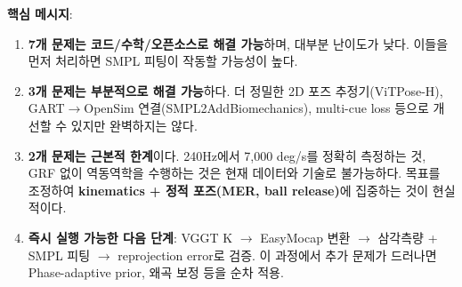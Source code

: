 \documentclass[11pt, a4paper]{report}
\begin{document}
\begin{summary}
\textbf{핵심 메시지}:
\begin{enumerate}[leftmargin=*]
  \item \textbf{7개 문제는 코드/수학/오픈소스로 해결 가능}하며, 대부분 난이도가 낮다. 이들을 먼저 처리하면 SMPL 피팅이 작동할 가능성이 높다.
  \item \textbf{3개 문제는 부분적으로 해결 가능}하다. 더 정밀한 2D 포즈 추정기(ViTPose-H), GART$\rightarrow$OpenSim 연결(SMPL2AddBiomechanics), multi-cue loss 등으로 개선할 수 있지만 완벽하지는 않다.
  \item \textbf{2개 문제는 근본적 한계}이다. 240Hz에서 7,000 deg/s를 정확히 측정하는 것, GRF 없이 역동역학을 수행하는 것은 현재 데이터와 기술로 불가능하다. 목표를 조정하여 \textbf{kinematics + 정적 포즈(MER, ball release)}에 집중하는 것이 현실적이다.
  \item \textbf{즉시 실행 가능한 다음 단계}: VGGT K $\rightarrow$ EasyMocap 변환 $\rightarrow$ 삼각측량 + SMPL 피팅 $\rightarrow$ reprojection error로 검증. 이 과정에서 추가 문제가 드러나면 Phase-adaptive prior, 왜곡 보정 등을 순차 적용.
\end{enumerate}
\end{summary}
\end{document}
